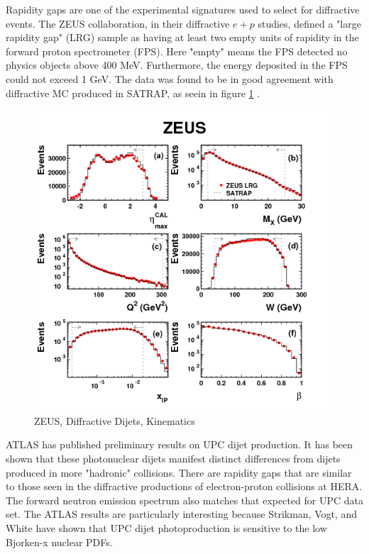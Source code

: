 Rapidity gaps are one of the experimental signatures used to select for diffractive events. The ZEUS collaboration, in their diffractive $e+p$ studies, defined a "large rapidity gap" (LRG) sample as having at least two empty units of rapidity in the forward proton spectrometer (FPS). Here "empty" means the FPS detected no physics objects above 400 MeV. Furthermore, the energy deposited in the FPS could not exceed 1 GeV. The data was found to be in good agreement with diffractive MC produced in SATRAP, as seein in figure \ref{fig:zeusKinematics} \cite{Chekanov:2008fh}. 

\begin{figure}[h!]
\begin{centering}
\includegraphics[width=6in]{Chapter2/importfigs/DESY-08-175_2.png}
\par\end{centering}
\caption{ZEUS, Diffractive Dijets, Kinematics \cite{Chekanov:2008fh} \label{fig:zeusKinematics}}
\end{figure}

ATLAS has published preliminary results on UPC dijet production. It has been shown that these photonuclear dijets manifest distinct differences from dijets produced in more "hadronic" collisions. There are rapidity gaps that are similar to those seen in the diffractive productions of electron-proton collisions at HERA. The forward neutron emission spectrum also matches that expected for UPC data set. The ATLAS results are particularly interesting because Strikman, Vogt, and White have shown that UPC dijet photoproduction is sensitive to the low Bjorken-x nuclear PDFs.

